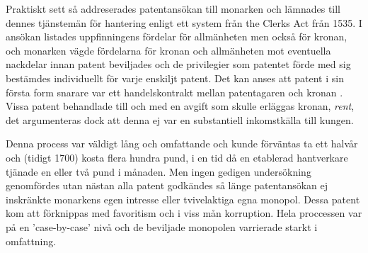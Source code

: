 Praktiskt sett så addreserades patentansökan till monarken och lämnades till dennes tjänstemän för hantering enligt ett
system från the Clerks Act från 1535\cite{bracha}. I ansökan listades uppfinningens fördelar för allmänheten men också
för kronan, och monarken vägde fördelarna för kronan och allmänheten mot eventuella nackdelar innan patent
beviljades och de privilegier som patentet förde med sig bestämdes individuellt för varje enskiljt patent. Det kan anses att patent i sin första form snarare var ett handelskontrakt mellan patentagaren och kronan
\cite{bracha}. Vissa patent behandlade till och med en avgift som skulle erläggas kronan, \emph{rent},
det argumenteras dock att denna ej var en substantiell inkomstkälla till kungen. \cite{macleod2}


Denna process var väldigt lång och omfattande och kunde
förväntas ta ett halvår och (tidigt 1700) kosta flera hundra pund, i en tid då en etablerad hantverkare tjänade en eller två pund i månaden. \cite{macleod}
Men ingen gedigen undersökning genomfördes utan nästan alla patent godkändes så
länge patentansökan ej inskränkte monarkens egen intresse eller tvivelaktiga egna monopol. 
Dessa patent kom att förknippas med favoritism och i viss mån korruption. Hela proccessen var på en
'case-by-case' nivå och de beviljade monopolen varrierade starkt i omfattning\cite{bracha}.

%


